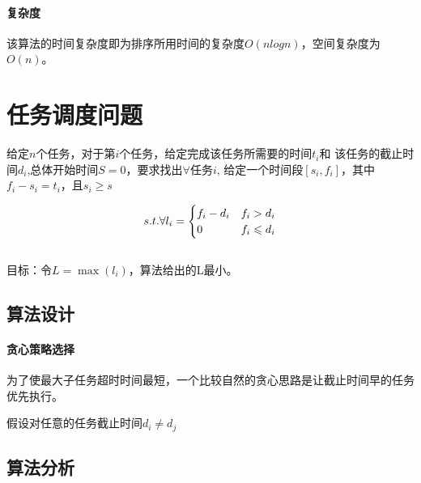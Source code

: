 \paragraph*{复杂度}
该算法的时间复杂度即为排序所用时间的复杂度$O(nlogn)$，空间复杂度为$O(n)$。

\section{任务调度问题}
\begin{example}
	给定$n$个任务，对于第$i$个任务，给定完成该任务所需要的时间$t_i$和
	该任务的截止时间$d_i$,总体开始时间$S=0$，要求找出$\forall$任务$i$,
	给定一个时间段$[s_i,f_i]$，其中$f_i - s_i = t_i$，且$s_i\geqslant s$

	\begin{equation}
		s.t. \forall \space l_i = \begin{cases}
			f_i - d_i & f_i > d_i    \\
			0        & f_i \leqslant d_i
		\end{cases}
	\end{equation}
	\\目标：令$L =\max(l_i)$，算法给出的L最小。
\end{example}

\subsection{算法设计}
\paragraph*{贪心策略选择}
为了使最大子任务超时时间最短，一个比较自然的贪心思路是让截止时间早的任务优先执行。

\begin{remark}
    假设对任意的任务截止时间$d_i \neq d_j$
\end{remark}

\subsection{算法分析}

